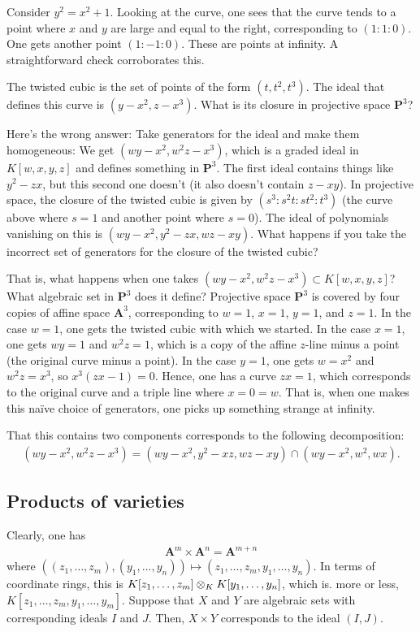 \documentclass [11 pt, oneside] {article}
\begin{document}
\begin{example}[ ]\label{}
Consider $y^2 = x^2 + 1$. Looking at the curve, one sees that the curve tends to a point where $x$ and $y$ are large and equal to the right, corresponding to $(1:1:0)$. One gets another point $(1:-1:0)$. These are points at infinity. A straightforward check corroborates this.
\end{example}

\begin{example}\label{}
The twisted cubic is the set of points of the form $(t,t^2,t^3)$. The ideal that defines this curve is $(y-x^2, z-x^3)$. What is its closure in projective space $\mathbf{P}^3$?

Here's the wrong answer: Take generators for the ideal and make them homogeneous: We get $ (wy-x^2,w^2z-x^3)$, which is a graded ideal in $K[w,x,y,z]$ and defines something in $\mathbf{P}^3$. The first ideal contains things like $y^2-zx$, but this second one doesn't (it also doesn't contain $z-xy$). In projective space, the closure of the twisted cubic is given by $(s^3:s^2t:st^2:t^3)$ (the curve above where $s=1$ and another point where $s=0$). The ideal of polynomials vanishing on this is $(wy-x^2, y^2-zx, wz- xy)$. What happens if you take the incorrect set of generators for the closure of the twisted cubic?

That is, what happens when one takes $(wy-x^2, w^2z - x^3) \subset K[w,x,y,z]$? What algebraic set in $\mathbf{P}^3$ does it define? Projective space $\mathbf{P}^3$ is covered by four copies of affine space $\mathbf{A}^3$, corresponding to $w=1$, $x=1$, $y=1$, and $z=1$. In the case $w=1$, one gets the twisted cubic with which we started. In the case $x=1$, one gets $wy=1$ and $w^2z = 1$, which is a copy of the affine $z$-line minus a point (the original curve minus a point). In the case $y=1$, one gets $w=x^2$ and $w^2z=x^3$, so $x^3(zx-1)=0$. Hence, one has a curve $zx=1$, which corresponds to the original curve and a triple line where $x=0=w$. That is, when one makes this na\"ive choice of generators, one picks up something strange at infinity.

That this contains two components corresponds to the following decomposition:
\begin{align*}
	(wy-x^2, w^2z - x^3) = (wy-x^2,y^2-xz, wz-xy) \cap  (wy-x^2, w^2, wx).
\end{align*}
\end{example}

\subsection{Products of varieties}
Clearly, one has
\begin{align*}
	\mathbf{A}^m \times \mathbf{A}^n = \mathbf{A}^{m+n}
\end{align*}
where $((z_1,\hdots,z_m),(y_1,\hdots,y_n))\longmapsto  (z_1,\hdots, z_m,y_1,\hdots, y_n)$. In terms of coordinate rings, this is $K[z_1,\hdots,z_m]\otimes_K K[y_1,\hdots, y_n]$, which is. more or less, $K[z_1,\hdots, z_m,y_1,\hdots, y_m]$. Suppose that $X$ and $Y$ are algebraic sets with corresponding ideals $I$ and $J$. Then, $X\times Y$ corresponds to the ideal $(I,J)$.
\end{document}
